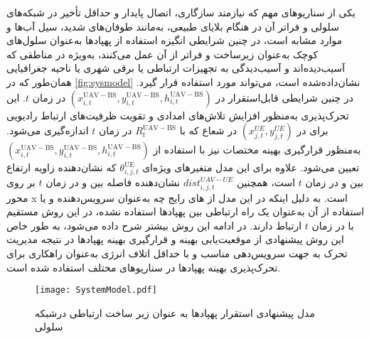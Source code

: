 یکی از سناریوهای مهم که نیازمند سازگاری، اتصال پایدار و حداقل تأخیر در شبکه‌های سلولی  و فراتر آن در هنگام بلایای طبیعی، به‌مانند طوفان‌های شدید، سیل آب‌ها و موارد مشابه است، در چنین شرایطی انگیزه استفاده از پهپادها به‌عنوان سلول‌های کوچک به‌عنوان زیرساخت  و فراتر از آن عمل می‌کنند، به‌ویژه در مناطقی که آسیب‌دیده‌اند و آسیب‌دیدگی به تجهیزات ارتباطی یا برقی شهری یا ناحیه جغرافیایی همان‌طور که در \autoref{fig:sysmodel} نشان‌داده‌شده است، می‌تواند مورد استفاده قرار گیرد. در چنین شرایطی  قابل‌استقرار در $ (x_{i,t}^ \mathrm{ \mathrm{{UAV-BS}}}, y_{i,t}^ \mathrm{ \mathrm{{UAV-BS}}}, h_{i,t}^ \mathrm{ \mathrm{{UAV-BS}}}) $ در زمان $t$. این تحرک‌پذیری به‌منظور افزایش تلاش‌های امدادی و تقویت ظرفیت‌های ارتباط رادیویی برای  در $ (x_{j,t}^{UE}, y_{j,t}^{UE}) $ در شعاع  که با $R_{t}^ \mathrm{ \mathrm{{UAV-BS}}}$ در زمان $t$ اندازه‌گیری می‌شود. به‌منظور قرارگیری بهینه مختصات نیز با استفاده از $ (x_{i,t}^ \mathrm{ \mathrm{{UAV-BS}}}, y_{i,t}^ \mathrm{ \mathrm{{UAV-BS}}}, h_{i,t}^ \mathrm{ \mathrm{{UAV-BS}}}) $ تعیین می‌شود. علاوه برای این مدل متغیرهای ویژه‌ای $\theta_{i,j,t}^{\mathrm{UE}}$ که نشان‌دهنده زاویه ارتفاع بین  و  در زمان $t$ است، همچنین $dist_{i,j,t}^{UAV-UE}$ نشان‌دهنده فاصله بین  و  در زمان $t$ بر روی محور x است. به دلیل اینکه در این مدل از های رایج چه به‌عنوان سرویس‌دهنده و یا استفاده از آن به‌عنوان یک راه ارتباطی بین پهپادها استفاده نشده، در این روش  مستقیم با  در زمان $t$ ارتباط دارند. در ادامه این روش بیشتر شرح داده می‌شود، به طور خاص این روش پیشنهادی از موقعیت‌یابی بهینه و قرارگیری بهینه پهپادها در نتیجه مدیریت تحرک به جهت سرویس‌دهی مناسب و با حداقل اتلاف انرژی به‌عنوان راهکاری برای تحرک‌پذیری بهینه پهپادها در سناریوهای مختلف استفاده شده است.
 
 
 
\begin{figure}
\texttt{[image: SystemModel.pdf]}
\caption[%
مدل پیشنهادی استقرار پهپاد‌ها به عنوان زیر ساخت ارتباطی درشبکه سلولی]{مدل پیشنهادی استقرار پهپاد‌ها به عنوان زیر ساخت ارتباطی درشبکه سلولی}
\label{fig:sysmodel}
\end{figure} 
 

